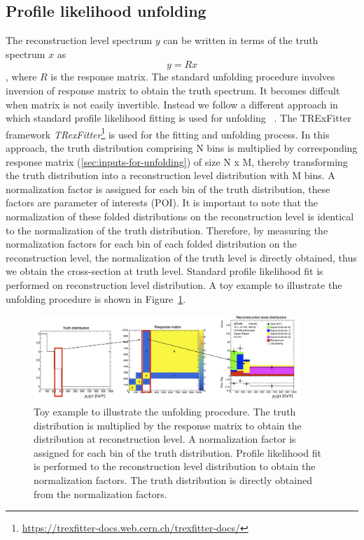 \subsection{Profile likelihood unfolding}
\label{sec:profile-likelihodd-unfolding}
The reconstruction level spectrum $y$ can be written in terms of the truth spectrum $x$ as $$ y = R x$$, where $R$ is the response matrix.
The standard unfolding procedure involves inversion of response matrix to obtain the truth spectrum. It becomes diffcult when matrix is not easily invertible. Instead we follow a different approach in which standard profile likelihood fitting is used for unfolding ~\cite{cls_3}. 
The TRExFitter framework \emph{TRexFitter}\footnote{\url{https://trexfitter-docs.web.cern.ch/trexfitter-docs/}} is used for the fitting and unfolding process. In this approach, the truth distribution comprising N bins is multiplied by corresponding response matrix (\cref{sec:inputs-for-unfolding}) of size N x M, thereby transforming the truth distribution into a reconstruction level distribution with M bins. A normalization factor is assigned for each bin of the truth distribution, these factors are parameter of interests (POI). It is important to note that the normalization of these folded distributions on the reconstruction level is identical to the normalization of the truth distribution. Therefore, by measuring the normalization factors for each bin of each folded distribution on the reconstruction level, the normalization of the truth level is directly obtained, thus we obtain the cross-section at truth level. Standard profile likelihood fit is performed on reconstruction level distribution. A toy example to illustrate the unfolding procedure is shown in Figure~\ref{fig:unfolding_toy_example}.

\begin{figure}[ht]
    \centering
    \includegraphics[width=0.9\textwidth]{figures/toy_profile_likelihood_fit.png}
    \caption{Toy example to illustrate the unfolding procedure. The truth distribution is multiplied by the response matrix to obtain the distribution at reconstruction level. A normalization factor is assigned for each bin of the truth distribution. Profile likelihood fit is performed to the reconstruction level distribution to obtain the normalization factors. The truth distribution is directly obtained from the normalization factors.}

    \label{fig:unfolding_toy_example}
\end{figure}
\FloatBarrier


